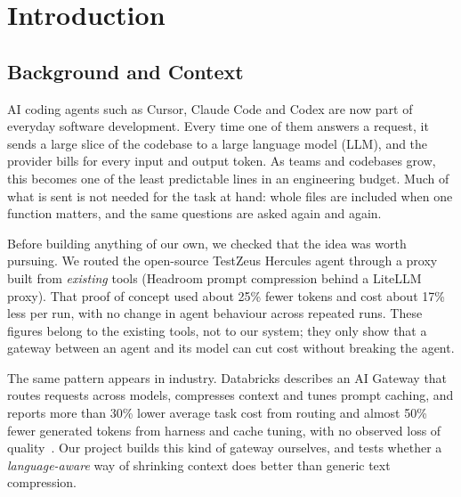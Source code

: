 \documentclass[12pt, a4paper, oneside]{report}
\begin{document}
\tableofcontents
\newpage
{}

\chapter{Introduction}

\section{Background and Context}

AI coding agents such as Cursor, Claude Code and Codex are now part of everyday
software development. Every time one of them answers a request, it sends a large
slice of the codebase to a large language model (LLM), and the provider bills for
every input and output token. As teams and codebases grow, this becomes one of the
least predictable lines in an engineering budget. Much of what is sent is not
needed for the task at hand: whole files are included when one function matters,
and the same questions are asked again and again.

Before building anything of our own, we checked that the idea was worth pursuing.
We routed the open-source TestZeus Hercules agent through a proxy built from
\emph{existing} tools (Headroom prompt compression behind a LiteLLM proxy). That
proof of concept used about 25\% fewer tokens and cost about 17\% less per run,
with no change in agent behaviour across repeated runs. These figures belong to
the existing tools, not to our system; they only show that a gateway between an
agent and its model can cut cost without breaking the agent.

The same pattern appears in industry. Databricks describes an AI Gateway that
routes requests across models, compresses context and tunes prompt caching, and
reports more than 30\% lower average task cost from routing and almost 50\% fewer
generated tokens from harness and cache tuning, with no observed loss of
quality~\cite{databricks}. Our project builds this kind of gateway ourselves, and
tests whether a \emph{language-aware} way of shrinking context does better than
generic text compression.
\end{document}
